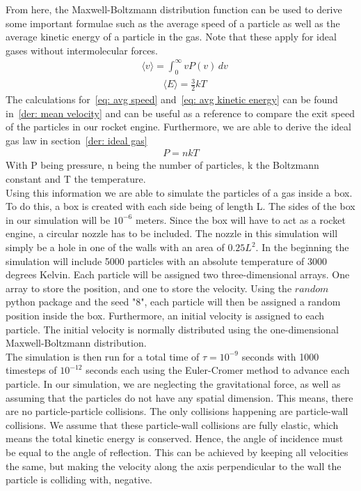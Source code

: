\documentclass[reprint,english,notitlepage]{revtex4-2}
\begin{document}
From here, the Maxwell-Boltzmann distribution function can be used to derive some important formulae such as the average speed of a particle as well as the average kinetic energy of a particle in the gas.
Note that these apply for ideal gases without intermolecular forces.
\begin{align}\label{eq: avg speed}
    &\langle v \rangle = \int_{0}^{\infty} vP(v)\,dv  
\end{align}
\begin{align}\label{eq: avg kinetic energy}
	&\langle E \rangle = \frac{3}{2}kT
\end{align}
The calculations for~\ref{eq: avg speed} and~\ref{eq: avg kinetic energy} can be found in~\ref{der: mean velocity} and can be useful as a reference to compare the exit speed of the particles in our rocket engine.
Furthermore, we are able to derive the ideal gas law in section~\ref{der: ideal gas}
\begin{align*}
    P = nkT
\end{align*}
With P being pressure, n being the number of particles, k the Boltzmann constant and T the temperature.\\

Using this information we are able to simulate the particles of a gas inside a box.
To do this, a box is created with each side being of length L. The sides of the box in our simulation will be $10^{-6}$ meters.
Since the box will have to act as a rocket engine, a circular nozzle has to be included.
The nozzle in this simulation will simply be a hole in one of the walls with an area of $0.25L^{2}$.
In the beginning the simulation will include 5000 particles with an absolute temperature of 3000 degrees Kelvin.
Each particle will be assigned two three-dimensional arrays. One array to store the position, and one to store the velocity.
Using the $random$ python package and the seed "8", each particle will then be assigned a random position inside the box.
Furthermore, an initial velocity is assigned to each particle. The initial velocity is normally distributed using the one-dimensional Maxwell-Boltzmann distribution.\\
The simulation is then run for a total time of $\tau = 10^{-9}$ seconds with 1000 timesteps of $10^{-12}$ seconds each using the Euler-Cromer method to advance each particle.
In our simulation, we are neglecting the gravitational force, as well as assuming that the particles do not have any spatial dimension.
This means, there are no particle-particle collisions. The only collisions happening are particle-wall collisions.
We assume that these particle-wall collisions are fully elastic, which means the total kinetic energy is conserved.
Hence, the angle of incidence must be equal to the angle of reflection.
This can be achieved by keeping all velocities the same, but making the velocity along the axis perpendicular to the wall the particle is colliding with, negative.
\end{document}
